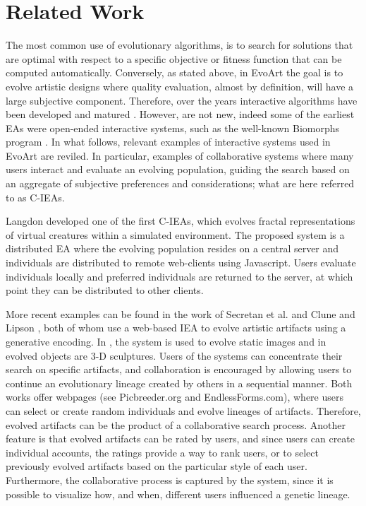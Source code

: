 \documentclass{sig-alternate}
\begin{document}
\section{Related Work}
\label{sec:related}
The most common use of evolutionary algorithms, is to search for solutions that are optimal with respect to a specific objective or fitness function that can be computed automatically.
Conversely, as stated above, in EvoArt the goal is to evolve artistic designs where quality evaluation, almost by definition, will have a large subjective component.
Therefore, over the years interactive algorithms have been developed and matured \cite{ie1,ie2}.
However, are not new, indeed some of the earliest EAs were open-ended interactive systems, such as the well-known Biomorphs program \cite{biomorphs}.
In what follows, relevant examples of interactive systems used in EvoArt are reviled.
In particular, examples of collaborative systems where many users interact and evaluate an evolving population, guiding the search based on an aggregate of subjective preferences and considerations; what are here referred to as C-IEAs.

Langdon \cite{langdon:2004} developed one of the first C-IEAs, which evolves fractal representations of virtual creatures within a simulated environment.
The proposed system is a distributed EA where the evolving population resides on a central server and individuals are distributed
to remote web-clients using Javascript.
Users evaluate individuals locally and preferred individuals are returned to the server, at which point they can be distributed to other clients.

More recent examples can be found in the work of Secretan et al. \cite{picbreeder} and Clune and Lipson \cite{forms}, both of whom use a web-based IEA to evolve artistic artifacts
using a generative encoding.
In \cite{picbreeder}, the system is used to evolve static images and in \cite{forms} evolved objects are 3-D sculptures.
Users of the systems can concentrate their search on specific artifacts, and collaboration is encouraged by allowing users to continue an evolutionary lineage created by others
in a sequential manner.
Both works offer webpages (see Picbreeder.org and EndlessForms.com),
where users can select or create random individuals and evolve lineages of artifacts.
Therefore, evolved artifacts can be the product of a collaborative search process.
Another feature is that evolved artifacts can be rated by users, and since users can create individual accounts, the ratings provide a way to rank users,
or to select previously evolved artifacts based on the particular style of each user.
Furthermore, the collaborative process is captured by the system, since it is possible to visualize how, and when, different users influenced
a genetic lineage.
\end{document}
